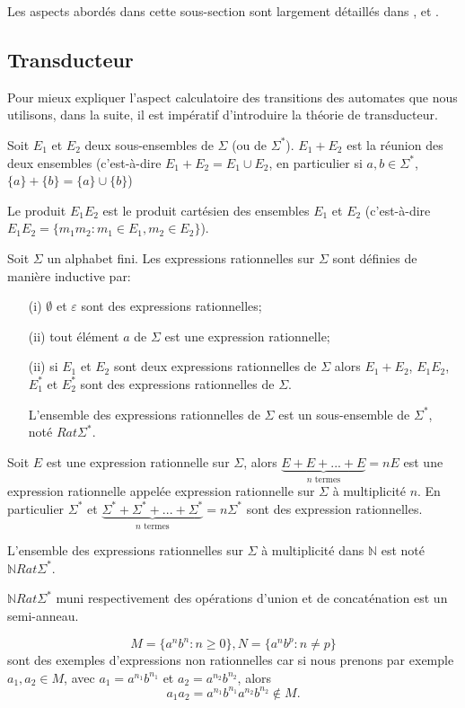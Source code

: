 Les aspects abordés dans cette sous-section sont largement détaillés dans \cite{Auto1}, \cite{Auto2} et  \cite{RaSc}.
\begin{spacing}{0.30}
\subsection{Transducteur}
\end{spacing}
Pour mieux expliquer l'aspect calculatoire des transitions des automates que nous utilisons, dans la suite, il est impératif d'introduire la théorie de transducteur.
\begin{Def}\label{dfb}
Soit $E_{1}$ et $E_{2}$ deux sous-ensembles de $\Sigma$ (ou de $\Sigma^{*}$).
 $E_{1}+E_{2}$ est la réunion des deux ensembles (c'est-à-dire $E_{1}+E_{2}=E_{1}\cup E_{2}$, en particulier si $a, b\in \Sigma^{*}$, $\{a\}+\{b\}=\{a\}\cup\{b\} $) 
 
 Le produit $E_{1}E_{2}$ est le produit cartésien des ensembles $E_{1}$ et $E_{2}$ (c'est-à-dire $E_{1}E_{2}=\{m_{1}m_{2}: m_{1}\in E_{1}, m_{2}\in E_{2}\}$).
 

\end{Def}
\begin{Def}\label{ExprRat}
Soit $\Sigma$  un alphabet fini. Les expressions rationnelles sur $\Sigma$ sont définies de manière inductive par:
\begin{itemize}
\item[(i)] $\emptyset$ et $\varepsilon$ sont des expressions rationnelles;
\item[(ii)] tout élément $a$ de $\Sigma$ est une expression rationnelle;
\item[(ii)] si $E_{1}$ et $E_{2}$ sont deux expressions rationnelles de $\Sigma$ alors $E_{1}+E_{2}$, $E_{1}E_{2}$, $E_{1}^{*}$ et $E_{2}^{*}$ sont des expressions rationnelles de $\Sigma$.


L'ensemble des expressions rationnelles de $\Sigma$ est un sous-ensemble de $\Sigma^{*}$, noté $Rat\Sigma^{*}$.
\end{itemize}
\begin{Rem}
Soit $E$ est une expression rationnelle sur $\Sigma$, alors $\displaystyle\underbrace{E+E+...+E}_{n\text{ termes}}=nE$ est une expression rationnelle appelée expression rationnelle sur $\Sigma$ à multiplicité $n$. En particulier $\Sigma^{*}$ et $\displaystyle\underbrace{\Sigma^{*}+\Sigma^{*}+...+\Sigma^{*}}_{n\text{ termes}}=n\Sigma^{*}$ sont des expression rationnelles.

L'ensemble des expressions rationnelles sur $\Sigma$ à multiplicité dans $\mathbb{N}$ est noté $\mathbb{N}Rat\Sigma^{*}$.

$\mathbb{N}Rat\Sigma^{*}$ muni respectivement des opérations d'union et de concaténation est un semi-anneau.


$$M=\{a^{n}b^{n}: n\geq 0\}, N=\{a^{n}b^{p}: n\neq p\}$$ sont des exemples d'expressions non rationnelles car si nous prenons par exemple $a_{1}, a_{2}\in M$, avec $a_{1}=a^{n_{1}}b^{n_{1}}$ et $a_{2}=a^{n_{2}}b^{n_{2}}$, alors $$a_{1}a_{2}=a^{n_{1}}b^{n_{1}}a^{n_{2}}b^{n_{2}}\notin M.$$
\end{Rem}
\end{Def}
